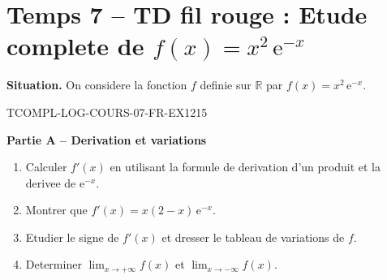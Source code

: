 

\section*{Temps 7 -- TD fil rouge : Etude complete de $f(x) = x^2\,\mathrm{e}^{-x}$}

\textbf{Situation.} On considere la fonction $f$ definie sur $\mathbb{R}$ par $f(x) = x^2\,\mathrm{e}^{-x}$.

\bigskip


\begin{exercice}{TCOMPL-LOG-COURS-07-FR-EX1}{2}{15}

\textbf{Partie A -- Derivation et variations}

\begin{enumerate}
  \item Calculer $f'(x)$ en utilisant la formule de derivation d'un produit et la derivee de $\mathrm{e}^{-x}$.
  \item Montrer que $f'(x) = x(2-x)\,\mathrm{e}^{-x}$.
  \item Etudier le signe de $f'(x)$ et dresser le tableau de variations de $f$.
  \item Determiner $\lim_{x \to +\infty} f(x)$ et $\lim_{x \to -\infty} f(x)$.
\end{enumerate}

\end{exercice}

